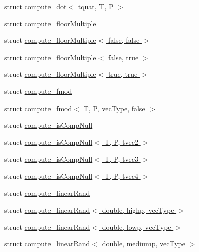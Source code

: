 \begin{DoxyCompactItemize}
\item 
struct \hyperlink{structglm_1_1detail_1_1compute__dot_3_01tquat_00_01_t_00_01_p_01_4}{compute\+\_\+dot$<$ tquat, T, P $>$}
\item 
struct \hyperlink{structglm_1_1detail_1_1compute__floor_multiple}{compute\+\_\+floor\+Multiple}
\item 
struct \hyperlink{structglm_1_1detail_1_1compute__floor_multiple_3_01false_00_01false_01_4}{compute\+\_\+floor\+Multiple$<$ false, false $>$}
\item 
struct \hyperlink{structglm_1_1detail_1_1compute__floor_multiple_3_01false_00_01true_01_4}{compute\+\_\+floor\+Multiple$<$ false, true $>$}
\item 
struct \hyperlink{structglm_1_1detail_1_1compute__floor_multiple_3_01true_00_01true_01_4}{compute\+\_\+floor\+Multiple$<$ true, true $>$}
\item 
struct \hyperlink{structglm_1_1detail_1_1compute__fmod}{compute\+\_\+fmod}
\item 
struct \hyperlink{structglm_1_1detail_1_1compute__fmod_3_01_t_00_01_p_00_01vec_type_00_01false_01_4}{compute\+\_\+fmod$<$ T, P, vec\+Type, false $>$}
\item 
struct \hyperlink{structglm_1_1detail_1_1compute__is_comp_null}{compute\+\_\+is\+Comp\+Null}
\item 
struct \hyperlink{structglm_1_1detail_1_1compute__is_comp_null_3_01_t_00_01_p_00_01tvec2_01_4}{compute\+\_\+is\+Comp\+Null$<$ T, P, tvec2 $>$}
\item 
struct \hyperlink{structglm_1_1detail_1_1compute__is_comp_null_3_01_t_00_01_p_00_01tvec3_01_4}{compute\+\_\+is\+Comp\+Null$<$ T, P, tvec3 $>$}
\item 
struct \hyperlink{structglm_1_1detail_1_1compute__is_comp_null_3_01_t_00_01_p_00_01tvec4_01_4}{compute\+\_\+is\+Comp\+Null$<$ T, P, tvec4 $>$}
\item 
struct \hyperlink{structglm_1_1detail_1_1compute__linear_rand}{compute\+\_\+linear\+Rand}
\item 
struct \hyperlink{structglm_1_1detail_1_1compute__linear_rand_3_01double_00_01highp_00_01vec_type_01_4}{compute\+\_\+linear\+Rand$<$ double, highp, vec\+Type $>$}
\item 
struct \hyperlink{structglm_1_1detail_1_1compute__linear_rand_3_01double_00_01lowp_00_01vec_type_01_4}{compute\+\_\+linear\+Rand$<$ double, lowp, vec\+Type $>$}
\item 
struct \hyperlink{structglm_1_1detail_1_1compute__linear_rand_3_01double_00_01mediump_00_01vec_type_01_4}{compute\+\_\+linear\+Rand$<$ double, mediump, vec\+Type $>$}

\end{DoxyCompactItemize}
